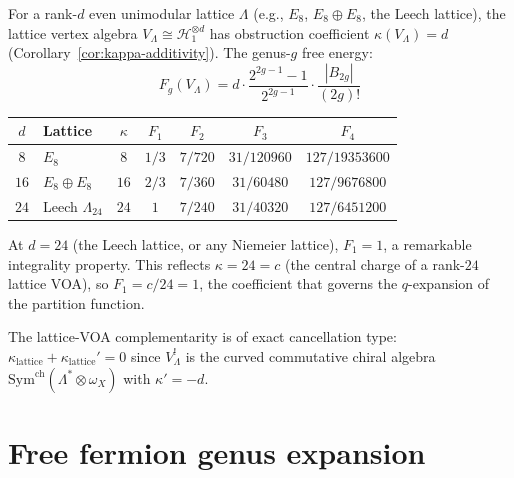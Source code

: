 \begin{computation}\label{comp:lattice-genus-expansion}

For a rank-$d$ even unimodular lattice $\Lambda$ (e.g., $E_8$, $E_8 \oplus E_8$, the Leech lattice), the lattice vertex algebra $V_\Lambda \cong \mathcal{H}_1^{\otimes d}$ has obstruction coefficient $\kappa(V_\Lambda) = d$ (Corollary~\ref{cor:kappa-additivity}). The genus-$g$ free energy:
\begin{equation}\label{eq:lattice-Fg-arbitrary-rank}
F_g(V_\Lambda) = d \cdot \frac{2^{2g-1}-1}{2^{2g-1}} \cdot \frac{|B_{2g}|}{(2g)!}
\end{equation}
\begin{center}
\renewcommand{\arraystretch}{1.3}
\begin{tabular}{clccccc}
\toprule
$d$ & Lattice & $\kappa$ & $F_1$ & $F_2$ & $F_3$ & $F_4$ \\
\midrule
$8$ & $E_8$ & $8$ & $1/3$ & $7/720$ & $31/120960$ & $127/19353600$ \\[3pt]
$16$ & $E_8 \oplus E_8$ & $16$ & $2/3$ & $7/360$ & $31/60480$ & $127/9676800$ \\[3pt]
$24$ & Leech $\Lambda_{24}$ & $24$ & $1$ & $7/240$ & $31/40320$ & $127/6451200$ \\
\bottomrule
\end{tabular}
\end{center}
At $d = 24$ (the Leech lattice, or any Niemeier lattice), $F_1 = 1$, a remarkable integrality property. This reflects $\kappa = 24 = c$ (the central charge of a rank-$24$ lattice VOA), so $F_1 = c/24 = 1$, the coefficient that governs the $q$-expansion of the partition function.

The lattice-VOA complementarity is of exact cancellation type: $\kappa_{\mathrm{lattice}} + \kappa_{\mathrm{lattice}}' = 0$ since $V_\Lambda^!$ is the curved commutative chiral algebra $\mathrm{Sym}^{\mathrm{ch}}(\Lambda^* \otimes \omega_X)$ with $\kappa' = -d$.
\end{computation}


\section{Free fermion genus expansion}\label{sec:fermion-genera}

